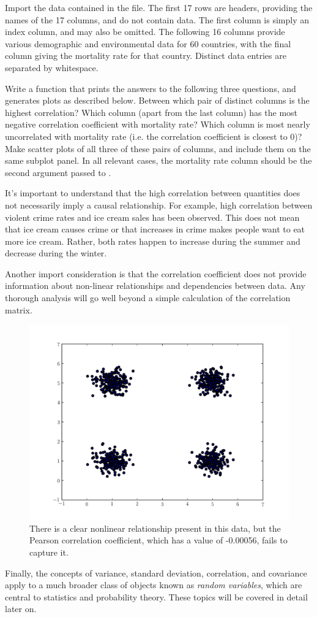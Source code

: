 \begin{problem}
Import the data contained in the  file. The first 17 rows are headers, providing the names of the
17 columns, and do not contain data. The first column is simply an index column, and may also be omitted.
The following 16 columns provide various demographic and environmental data for 60 countries, with the
final column giving the mortality rate for that country.
Distinct data entries are separated by whitespace.

Write a function that prints the answers to the following three questions, and generates plots as
described below.
Between which pair of distinct columns is the highest correlation?
Which column (apart from the last column) has the most negative correlation coefficient with mortality rate?
Which column is most nearly uncorrelated with mortality rate (i.e. the correlation coefficient is closest to 0)?
Make scatter plots of all three of these pairs of columns, and include them on the same subplot panel.
In all relevant cases, the mortality rate column should be the second argument passed to .
\end{problem}

It's important to understand that the high correlation between quantities does not necessarily imply
a causal relationship. For example, high correlation between violent crime rates and ice cream sales has
been observed. This does not mean that ice cream causes crime or that increases in crime makes people want
to eat more ice cream. Rather, both rates happen to increase during the summer and decrease during the winter.

Another import consideration is that the correlation coefficient does not provide information about
non-linear relationships and dependencies between data. Any thorough analysis will go well beyond a simple
calculation of the correlation matrix.

\begin{figure}[h]
\includegraphics[width=\textwidth]{nonlinear_dependence}
\caption{There is a clear nonlinear relationship present in this data, but the Pearson correlation
         coefficient, which has a value of -0.00056, fails to capture it.}
\label{fig:correlation}
\end{figure}

Finally, the concepts of variance, standard deviation, correlation, and covariance apply to a much broader class of objects
known as \emph{random variables}, which are central to statistics and probability theory. These topics will be
covered in detail later on.
